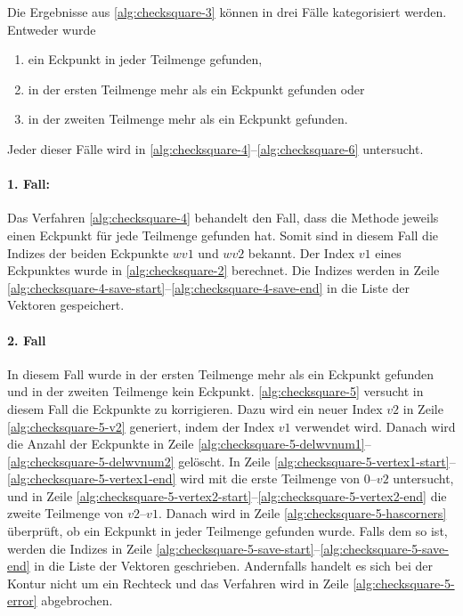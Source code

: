 Die Ergebnisse aus \autoref{alg:checksquare-3} können in drei Fälle kategorisiert werden. Entweder wurde

\begin{enumerate}
	\item ein Eckpunkt in jeder Teilmenge gefunden, \label{enum:checksquare-case1}
	\item in der ersten Teilmenge mehr als ein Eckpunkt gefunden oder \label{enum:checksquare-case2}
	\item in der zweiten Teilmenge mehr als ein Eckpunkt gefunden. \label{enum:checksquare-case3}
\end{enumerate}

Jeder dieser Fälle wird in \autoref{alg:checksquare-4}--\autoref{alg:checksquare-6} untersucht.

\paragraph{1. Fall:} %
\label{par:1_fall}

Das Verfahren \autoref{alg:checksquare-4} behandelt den Fall, dass die Methode  jeweils einen
 Eckpunkt für jede Teilmenge gefunden hat. Somit sind in diesem Fall die Indizes der beiden Eckpunkte $\mathit{wv1}$
 und $\mathit{wv2}$ bekannt. Der Index $\mathit{v1}$ eines Eckpunktes wurde in \autoref{alg:checksquare-2} berechnet.
 Die Indizes werden in Zeile \ref{alg:checksquare-4-save-start}--\ref{alg:checksquare-4-save-end} in die Liste der
 Vektoren gespeichert.




\paragraph{2. Fall} %
\label{par:2_fall}

In diesem Fall wurde in der ersten Teilmenge mehr als ein Eckpunkt gefunden und in der zweiten Teilmenge kein Eckpunkt.
 \autoref{alg:checksquare-5} versucht in diesem Fall die Eckpunkte zu korrigieren. Dazu wird ein neuer Index
 $\mathit{v2}$ in Zeile \ref{alg:checksquare-5-v2} generiert, indem der Index $\mathit{v1}$ verwendet wird. Danach wird
 die Anzahl der Eckpunkte in Zeile \ref{alg:checksquare-5-delwvnum1}--\ref{alg:checksquare-5-delwvnum2} gelöscht. In
 Zeile \ref{alg:checksquare-5-vertex1-start}--\ref{alg:checksquare-5-vertex1-end} wird mit  die
 erste Teilmenge von $0$--$\mathit{v2}$ untersucht, und in Zeile
 \ref{alg:checksquare-5-vertex2-start}--\ref{alg:checksquare-5-vertex2-end} die zweite Teilmenge von
 $\mathit{v2}$--$\mathit{v1}$. Danach wird in Zeile \ref{alg:checksquare-5-hascorners} überprüft, ob ein Eckpunkt in
 jeder Teilmenge gefunden wurde. Falls dem so ist, werden die Indizes in Zeile
 \ref{alg:checksquare-5-save-start}--\ref{alg:checksquare-5-save-end} in die Liste der Vektoren geschrieben. Andernfalls
 handelt es sich bei der Kontur nicht um ein Rechteck und das Verfahren wird in Zeile \ref{alg:checksquare-5-error}
 abgebrochen.

